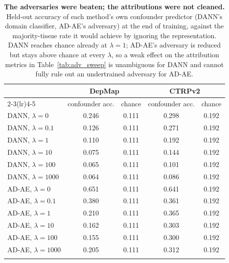 \begin{table}[t]
  \centering
  \footnotesize
  \begin{tabular}{l cc cc}
    \toprule
    & \multicolumn{2}{c}{DepMap} & \multicolumn{2}{c}{CTRPv2} \\
    \cmidrule(lr){2-3}\cmidrule(lr){4-5}
    & confounder acc. & chance & confounder acc. & chance \\
    \midrule
    DANN, $\lambda=0$ & 0.246 & 0.111 & 0.298 & 0.192 \\
    DANN, $\lambda=0.1$ & 0.126 & 0.111 & 0.271 & 0.192 \\
    DANN, $\lambda=1$ & 0.110 & 0.111 & 0.192 & 0.192 \\
    DANN, $\lambda=10$ & 0.075 & 0.111 & 0.144 & 0.192 \\
    DANN, $\lambda=100$ & 0.065 & 0.111 & 0.101 & 0.192 \\
    DANN, $\lambda=1000$ & 0.064 & 0.111 & 0.086 & 0.192 \\
    \addlinespace
    AD-AE, $\lambda=0$ & 0.651 & 0.111 & 0.641 & 0.192 \\
    AD-AE, $\lambda=0.1$ & 0.380 & 0.111 & 0.361 & 0.192 \\
    AD-AE, $\lambda=1$ & 0.210 & 0.111 & 0.365 & 0.192 \\
    AD-AE, $\lambda=10$ & 0.162 & 0.111 & 0.303 & 0.192 \\
    AD-AE, $\lambda=100$ & 0.155 & 0.111 & 0.300 & 0.192 \\
    AD-AE, $\lambda=1000$ & 0.205 & 0.111 & 0.312 & 0.192 \\
    \addlinespace
    \bottomrule
  \end{tabular}
  \caption{\textbf{The adversaries were beaten; the attributions were not cleaned.} Held-out accuracy of each method's own confounder predictor (DANN's domain classifier, AD-AE's adversary) at the end of training, against the majority-tissue rate it would achieve by ignoring the representation. DANN reaches chance already at $\lambda=1$; AD-AE's adversary is reduced but stays above chance at every $\lambda$, so a weak effect on the attribution metrics in Table~\ref{tab:adv_sweep} is unambiguous for DANN and cannot fully rule out an undertrained adversary for AD-AE.}
  \label{tab:adv_diagnostics}
\end{table}
